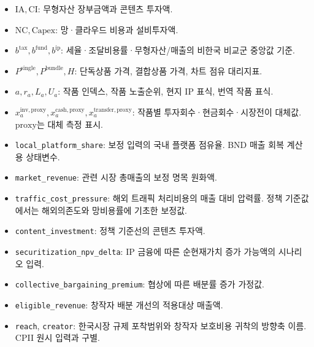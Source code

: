 \documentclass[11pt,a4paper]{report}
\begin{document}
\begin{itemize}[leftmargin=1.8em,itemsep=0.35em]
\item \(\mathrm{IA},\mathrm{CI}\): 무형자산 장부금액과 콘텐츠 투자액.
\item \(\mathrm{NC},\mathrm{Capex}\): 망·클라우드 비용과 설비투자액.
\item \(b^{\mathrm{tax}},b^{\mathrm{fund}},b^{\mathrm{ip}}\): 세율·조달비용률·무형자산/매출의 비한국 비교군 중앙값 기준.
\item \(P^{\mathrm{single}},P^{\mathrm{bundle}},H\): 단독상품 가격, 결합상품 가격, 차트 점유 대리지표.
\item \(a,r_a,L_a,U_a\): 작품 인덱스, 작품 노출순위, 현지 IP 표식, 번역 작품 표식.
\item \(x^{\mathrm{inv,proxy}}_a,x^{\mathrm{cash,proxy}}_a,x^{\mathrm{transfer,proxy}}_a\): 작품별 투자회수·현금회수·시장전이 대체값. \(\mathrm{proxy}\)는 대체 측정 표시.
\item \nolinkurl{local_platform_share}: 보정 입력의 국내 플랫폼 점유율. BND 매출 회복 계산용 상태변수.
\item \nolinkurl{market_revenue}: 관련 시장 총매출의 보정 명목 원화액.
\item \nolinkurl{traffic_cost_pressure}: 해외 트래픽 처리비용의 매출 대비 압력률. 정책 기준값에서는 해외의존도와 망비용률에 기초한 보정값.
\item \nolinkurl{content_investment}: 정책 기준선의 콘텐츠 투자액.
\item \nolinkurl{securitization_npv_delta}: IP 금융에 따른 순현재가치 증가 가능액의 시나리오 입력.
\item \nolinkurl{collective_bargaining_premium}: 협상에 따른 배분률 증가 가정값.
\item \nolinkurl{eligible_revenue}: 창작자 배분 개선의 적용대상 매출액.
\item \nolinkurl{reach}, \nolinkurl{creator}: 한국시장 규제 포착범위와 창작자 보호비용 귀착의 방향축 이름. CPII 원시 입력과 구별.
\end{itemize}
\endgroup
\end{document}

